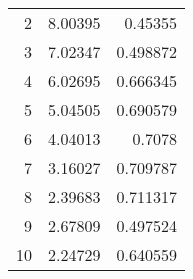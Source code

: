 \begin{tabular}{rrr}
    2 & 8.00395 & 0.45355 \\
    3 & 7.02347 & 0.498872 \\
    4 & 6.02695 & 0.666345 \\
    5 & 5.04505 & 0.690579 \\
    6 & 4.04013 & 0.7078 \\
    7 & 3.16027 & 0.709787 \\
    8 & 2.39683 & 0.711317 \\
    9 & 2.67809 & 0.497524 \\
    10 & 2.24729 & 0.640559 \\
\end{tabular}
